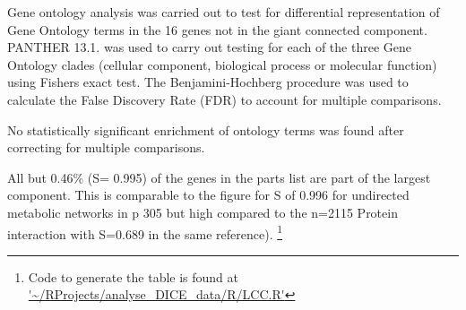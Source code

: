 Gene ontology analysis was carried out to test for differential representation of Gene Ontology terms in the 16 genes not in the giant connected component. PANTHER 13.1.\cite{mi2013large} was used to carry out testing for each of the three Gene Ontology clades (cellular component, biological process or molecular function) using Fishers exact test. The Benjamini-Hochberg procedure \cite{benjamini1995controlling} was used to calculate the False Discovery Rate (FDR) to account for multiple comparisons.

No statistically significant enrichment of ontology terms was found after correcting for multiple comparisons. 

All but 0.46\% (S= 0.995) of the genes in the parts list are part of the largest component. This is comparable to the figure for S of 0.996 for undirected metabolic networks in \cite{newman2018networks} p 305 but high compared to the n=2115 Protein interaction with S=0.689 in the same reference). \footnote{Code to generate the table is found at \url{'~/RProjects/analyse_DICE_data/R/LCC.R'}}


